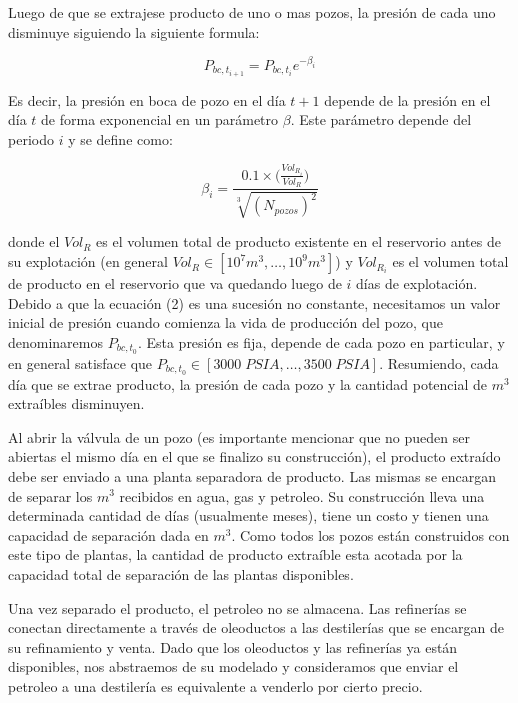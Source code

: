 \documentclass[10pt,a4paper]{article}
\begin{document}
\pagebreak

Luego de que se extrajese producto de uno o mas pozos, la presión de cada uno disminuye siguiendo la siguiente formula:

\begin{equation}
P_{bc, t_{i+1}} = P_{bc, t_i} e^{-\beta_i}
\end{equation}

Es decir, la presión en boca de pozo en el día $t+1$ depende de la presión en el día $t$ de forma exponencial en un parámetro $\beta$. Este parámetro depende del periodo $i$ y se define como:

\begin{equation}
\beta_i = \frac{0.1 \times \Big(\frac{Vol_{R_i}}{Vol_R}\Big)}{\sqrt[3]{(N_{pozos})^2}}
\end{equation}

donde el $Vol_R$ es el volumen total de producto existente en el reservorio antes de su explotación (en general $Vol_R \in [10^7m^3, \ldots, 10^9m^3]$) y $Vol_{R_i}$ es el volumen total de producto en el reservorio que va quedando luego de $i$ días de explotación. Debido a que la ecuación (2) es una sucesión no constante, necesitamos un valor inicial de presión cuando comienza la vida de producción del pozo, que denominaremos $P_{bc,t_0}$. Esta presión es fija, depende de cada pozo en particular, y en general satisface que $P_{bc,t_0} \in [3000 \; PSIA, \ldots, 3500 \; PSIA]$. Resumiendo, cada día que se extrae producto, la presión de cada pozo y la cantidad potencial de $m^3$ extraíbles disminuyen.

Al abrir la válvula de un pozo (es importante mencionar que no pueden ser abiertas el mismo día en el que se finalizo su construcción), el producto extraído debe ser enviado a una planta separadora de producto. Las mismas se encargan de separar los $m^3$ recibidos en agua, gas y petroleo. Su construcción lleva una determinada cantidad de días (usualmente meses), tiene un costo y tienen una capacidad de separación dada en $m^3$. Como todos los pozos están construidos con este tipo de plantas, la cantidad de producto extraíble esta acotada por la capacidad total de separación de las plantas disponibles.

Una vez separado el producto, el petroleo no se almacena. Las refinerías se conectan directamente a través de oleoductos a las destilerías que se encargan de su refinamiento y venta. Dado que los oleoductos y las refinerías ya están disponibles, nos abstraemos de su modelado y consideramos que enviar el petroleo a una destilería es equivalente a venderlo por cierto precio.
\end{document}
